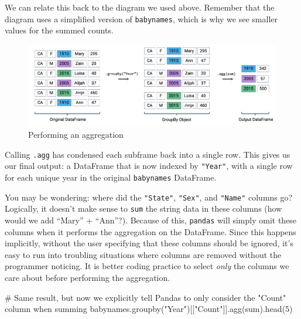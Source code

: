\documentclass[
  letterpaper,
  DIV=11,
  numbers=noendperiod]{scrreprt}
\newenvironment{Shaded}{\begin{snugshade}}{\end{snugshade}}
\newcommand{\BuiltInTok}[1]{\textcolor[rgb]{0.00,0.23,0.31}{#1}}
\newcommand{\CommentTok}[1]{\textcolor[rgb]{0.37,0.37,0.37}{#1}}
\newcommand{\DecValTok}[1]{\textcolor[rgb]{0.68,0.00,0.00}{#1}}
\newcommand{\NormalTok}[1]{\textcolor[rgb]{0.00,0.23,0.31}{#1}}
\newcommand{\StringTok}[1]{\textcolor[rgb]{0.13,0.47,0.30}{#1}}
\begin{document}
We can relate this back to the diagram we used above. Remember that the
diagram uses a simplified version of \texttt{babynames}, which is why we
see smaller values for the summed counts.

\begin{figure}

{\centering \includegraphics{pandas_2/images/agg.png}

}

\caption{Performing an aggregation}

\end{figure}

Calling \texttt{.agg} has condensed each subframe back into a single
row. This gives us our final output: a DataFrame that is now indexed by
\texttt{"Year"}, with a single row for each unique year in the original
\texttt{babynames} DataFrame.

You may be wondering: where did the \texttt{"State"}, \texttt{"Sex"},
and \texttt{"Name"} columns go? Logically, it doesn't make sense to
\texttt{sum} the string data in these columns (how would we add ``Mary''
+ ``Ann''?). Because of this, \texttt{pandas} will simply omit these
columns when it performs the aggregation on the DataFrame. Since this
happens implicitly, without the user specifying that these columns
should be ignored, it's easy to run into troubling situations where
columns are removed without the programmer noticing. It is better coding
practice to select \emph{only} the columns we care about before
performing the aggregation.

\begin{Shaded}
\begin{Highlighting}[]
\CommentTok{\# Same result, but now we explicitly tell Pandas to only consider the "Count" column when summing}
\NormalTok{babynames.groupby(}\StringTok{"Year"}\NormalTok{)[[}\StringTok{"Count"}\NormalTok{]].agg(}\BuiltInTok{sum}\NormalTok{).head(}\DecValTok{5}\NormalTok{)}
\end{Highlighting}
\end{Shaded}
\end{document}
